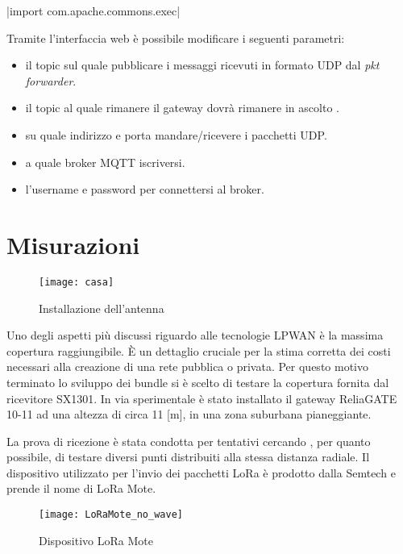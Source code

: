 |import com.apache.commons.exec|

Tramite l'interfaccia web è possibile modificare i seguenti parametri:
\begin{itemize}
\item il topic sul quale pubblicare i messaggi ricevuti in formato UDP dal
\emph{pkt forwarder}.
\item il topic al quale rimanere il gateway dovrà rimanere in ascolto .
\item su quale indirizzo e porta mandare/ricevere i pacchetti UDP.
\item a quale broker MQTT iscriversi.
\item l'username e password per connettersi al broker.
\end{itemize}


\section{Misurazioni}

\begin{figure}[th]
        \centering 
                \texttt{[image: casa]}
        \caption{Installazione dell'antenna}
        \label{fig:Software_stack}
\end{figure}

Uno degli aspetti più discussi riguardo alle tecnologie LPWAN è la massima copertura raggiungibile.
È un dettaglio cruciale per la stima corretta dei costi necessari
alla creazione di una rete pubblica o privata. 
Per questo motivo terminato lo sviluppo dei bundle si è scelto di testare la
copertura fornita dal ricevitore SX1301.
In via sperimentale è stato installato  il gateway
ReliaGATE 10-11 ad una altezza di circa 11 [m], in una zona suburbana pianeggiante.

La prova di ricezione è stata condotta per
tentativi cercando , per quanto possibile, di testare diversi punti distribuiti
alla stessa distanza radiale. 
Il dispositivo utilizzato per l'invio dei pacchetti LoRa è prodotto dalla
Semtech e prende il nome di LoRa Mote.

\begin{figure}[th]
        \centering 
                \texttt{[image: LoRaMote\_no\_wave]}
        \caption{Dispositivo LoRa Mote}
        \label{fig:Software_stack}
\end{figure}

